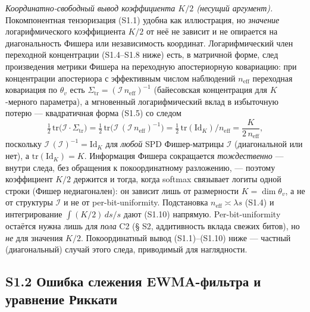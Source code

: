 \documentclass[12pt]{iopart}
\begin{document}
\emph{Координатно-свободный вывод коэффициента \(K/2\) (несущий аргумент).} Покомпонентная тензоризация (S1.1) удобна как иллюстрация, но \emph{значение} логарифмического коэффициента \(K/2\) от неё не зависит и не опирается на диагональность Фишера или независимость координат. Логарифмический член переходной концентрации (S1.4--S1.8 ниже) есть, в матричной форме, след произведения метрики Фишера на переходную апостериорную ковариацию: при концентрации апостериора с эффективным числом наблюдений \(n_{\text{eff}}\) переходная ковариация по \(\theta_v\) есть \(\Sigma_{\text{tr}} = (\mathcal I\,n_{\text{eff}})^{-1}\) (байесовская концентрация для \(K\)-мерного параметра), а мгновенный логарифмический вклад в избыточную потерю --- квадратичная форма (S1.5) со следом \[\tfrac12\,\mathrm{tr}\!\big(\mathcal I\cdot\Sigma_{\text{tr}}\big) = \tfrac12\,\mathrm{tr}\!\big(\mathcal I\,(\mathcal I\,n_{\text{eff}})^{-1}\big) = \tfrac12\,\mathrm{tr}(\mathrm{Id}_K)/n_{\text{eff}} = \frac{K}{2\,n_{\text{eff}}},\] поскольку \(\mathcal I\,(\mathcal I)^{-1} = \mathrm{Id}_K\) для \emph{любой} SPD Фишер-матрицы \(\mathcal I\) (диагональной или нет), а \(\mathrm{tr}(\mathrm{Id}_K) = K\). Информация Фишера сокращается \emph{тождественно} --- внутри следа, без обращения к покоординатному разложению, --- поэтому коэффициент \(K/2\) держится и тогда, когда softmax связывает логиты одной строки (Фишер недиагонален): он зависит лишь от размерности \(K = \dim\theta_v\), а не от структуры \(\mathcal I\) и не от per-bit-uniformity. Подстановка \(n_{\text{eff}} \asymp \lambda s\) (S1.4) и интегрирование \(\int (K/2)\,ds/s\) дают (S1.10) напрямую. Per-bit-uniformity остаётся нужна лишь для \emph{пола} C2 (§ S2, аддитивность вклада свежих битов), но \emph{не} для значения \(K/2\). Покоординатный вывод (S1.1)--(S1.10) ниже --- частный (диагональный) случай этого следа, приводимый для наглядности.



\subsection{S1.2 Ошибка слежения EWMA-фильтра и уравнение Риккати}\label{s1.2-ux43eux448ux438ux431ux43aux430-ux441ux43bux435ux436ux435ux43dux438ux44f-ewma-ux444ux438ux43bux44cux442ux440ux430-ux438-ux443ux440ux430ux432ux43dux435ux43dux438ux435-ux440ux438ux43aux43aux430ux442ux438}
\end{document}
